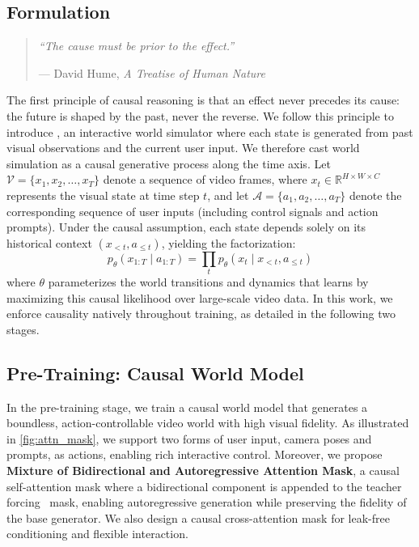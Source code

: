 \subsection{Formulation}
\label{sec:formulation}
%
\begin{quote}
\itshape ``The cause must be prior to the effect.'' \par
\normalfont\hfill --- David Hume, \emph{A Treatise of Human Nature}~\cite{hume2000treatise}
\end{quote}
The first principle of causal reasoning is that an effect never precedes its cause: the future is shaped by the past, never the reverse.
%
We follow this principle to introduce {\method}, an interactive world simulator where each state is generated from past visual observations and the current user input.
%
We therefore cast world simulation as a causal generative process along the time axis. 
Let $\mathcal{V} = \{x_1, x_2, \dots, x_T\}$ denote a sequence of video frames, where $x_t \in \mathbb{R}^{H \times W \times C}$ represents the visual state at time step $t$, and let $\mathcal{A} = \{a_1, a_2, \dots, a_T\}$ denote the corresponding sequence of user inputs (including control signals and action prompts).
Under the causal assumption, each state depends solely on its historical context $(x_{<t}, a_{\le t})$, yielding the factorization:
\begin{equation}
\label{equ:causal_factorization}
    p_\theta(x_{1:T} \mid a_{1:T}) = \prod_{t} p_\theta\!\left(x_t \mid x_{<t}, a_{\le t}\right)
\end{equation}
where $\theta$ parameterizes the world transitions and dynamics that {\method} learns by maximizing this causal likelihood over large-scale video data.
%
In this work, we enforce causality natively throughout training, as detailed in the following two stages.

\subsection{Pre-Training: Causal World Model}
\label{sec:pretraining}
%
In the pre-training stage, we train a causal world model that generates a boundless, action-controllable video world with high visual fidelity.
%
As illustrated in \cref{fig:attn_mask}, we support two forms of user input, camera poses and prompts, as actions, enabling rich interactive control.
%
Moreover, we propose \textbf{Mixture of Bidirectional and Autoregressive Attention Mask}, a causal self-attention mask where a bidirectional component is appended to the teacher forcing~\cite{williams1989learning} mask, enabling autoregressive generation while preserving the fidelity of the base generator.
%
We also design a causal cross-attention mask for leak-free conditioning and flexible interaction.

